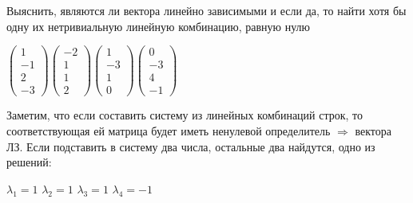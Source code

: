 \documentclass[12pt]{article}
\newenvironment{problem}[2][Problem]
{\begin{trivlist}\item[{\bfseries #1} {\bfseries #2.}]}{\end{trivlist}}
\newenvironment{solutions}[2][Solutions]
{\begin{trivlist}\item[{\bfseries #1} {\bfseries #2.}]}{\end{trivlist}}
\begin{document}
\begin{problem}{4} 
Выяснить, являются ли вектора линейно зависимыми и если да, то найти хотя бы одну их нетривиальную линейную комбинацию, равную нулю

\begin{center}
$\begin{pmatrix}
1\\
-1\\
2\\
-3
\end{pmatrix}
\begin{pmatrix}
-2\\
1\\
1\\
2
\end{pmatrix}
\begin{pmatrix}
1\\
-3\\
1\\
0
\end{pmatrix}
\begin{pmatrix}
0\\
-3\\
4\\
-1
\end{pmatrix}$
\end{center}
\end{problem}

\begin{solutions}{4} 
Заметим, что если составить систему из линейных комбинаций строк, то соответствующая ей матрица будет иметь ненулевой определитель $\Rightarrow$ вектора ЛЗ. Если подставить в систему два числа, остальные два найдутся, одно из решений:

\begin{center}$\lambda_1=1$ $\lambda_2=1$ $\lambda_3=1$ $\lambda_4=-1$\end{center}
\end{solutions}
\end{document}
